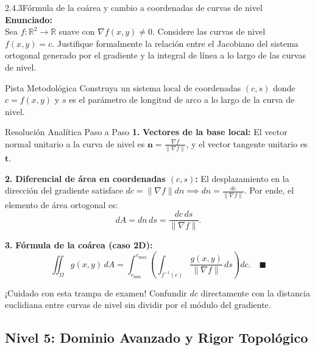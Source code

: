 \documentclass[11pt,a4paper]{article}
\begin{document}
\begin{nivelbox}{2.4.3}{Fórmula de la coárea y cambio a coordenadas de curvas de nivel}
\textbf{Enunciado:}\\
Sea $f: \mathbb{R}^2 \to \mathbb{R}$ suave con $\nabla f(x,y) \neq 0$. Considere las curvas de nivel $f(x,y) = c$. Justifique formalmente la relación entre el Jacobiano del sistema ortogonal generado por el gradiente y la integral de línea a lo largo de las curvas de nivel.

\begin{observacionbox}{Pista Metodológica}
Construya un sistema local de coordenadas $(c, s)$ donde $c = f(x,y)$ y $s$ es el parámetro de longitud de arco a lo largo de la curva de nivel.
\end{observacionbox}

\begin{ejerciciobox}{Resolución Analítica Paso a Paso}
\smallskip\noindent\textbf{1.} \textbf{Vectores de la base local:}
El vector normal unitario a la curva de nivel es $\mathbf{n} = \frac{\nabla f}{\|\nabla f\|}$, y el vector tangente unitario es $\mathbf{t}$.

\smallskip\noindent\textbf{2.} \textbf{Diferencial de área en coordenadas $(c, s)$:}
El desplazamiento en la dirección del gradiente satisface $dc = \|\nabla f\| dn \implies dn = \frac{dc}{\|\nabla f\|}$.
Por ende, el elemento de área ortogonal es:
\[dA = dn \, ds = \frac{dc \, ds}{\|\nabla f\|}.\]

\smallskip\noindent\textbf{3.} \textbf{Fórmula de la coárea (caso 2D):}
\[\iint_\Omega g(x,y) \, dA = \int_{c_{\min}}^{c_{\max}} \left( \int_{f^{-1}(c)} \frac{g(x,y)}{\|\nabla f\|} \, ds \right) dc. \quad \blacksquare\]
\end{ejerciciobox}

\begin{errorbox}{¡Cuidado con esta trampa de examen!}
Confundir $dc$ directamente con la distancia euclidiana entre curvas de nivel sin dividir por el módulo del gradiente.
\end{errorbox}
\end{nivelbox}
\bigskip

\subsection{Nivel 5: Dominio Avanzado y Rigor Topológico}
\end{document}
